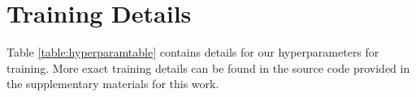 \section{Training Details}
\label{sec:appendix:trainingdetails}

Table \ref{table:hyperparamtable} contains details for our hyperparameters for training. More exact training details can be found in the source code provided in the supplementary materials for this work.

\trainingdetailstable

\ablationdetailstable %

\ablationtable %